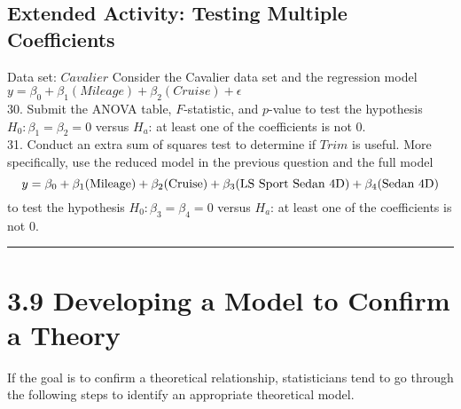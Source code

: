 \documentclass[
]{report}
\theoremstyle{definition}
\theoremstyle{definition}
\theoremstyle{definition}
\theoremstyle{definition}
\theoremstyle{remark}
\begin{document}
\hypertarget{extended-activity-testing-multiple-coefficients}{%
\subsection*{Extended Activity: Testing Multiple Coefficients}\label{extended-activity-testing-multiple-coefficients}}

Data set: \(Cavalier\)
Consider the Cavalier data set and the regression model \(y = \beta_0 + \beta_1(Mileage) + \beta_2(Cruise) + \epsilon\)\\
30. Submit the ANOVA table, \(F\)-statistic, and \(p\)-value to test the hypothesis \(H_0: \beta_1 = \beta_2 = 0\) versus \(H_a\): at least one of the coefficients is not 0.\\
31. Conduct an extra sum of squares test to determine if \(Trim\) is useful. More specifically, use the reduced model in the previous question and the full model
\begin{equation}
y = \beta_0 + \beta_1(\text{Mileage}) + \beta_2(\text{Cruise}) + \beta_3(\text{LS Sport Sedan 4D}) + \beta_4(\text{Sedan 4D}) \notag
\end{equation}
to test the hypothesis \(H_0: \beta_3 = \beta_4 = 0\) versus \(H_a\): at least one of the coefficients is not 0.

\begin{center}\rule{0.5\linewidth}{0.5pt}\end{center}

\hypertarget{developing-a-model-to-confirm-a-theory}{%
\section{3.9 Developing a Model to Confirm a Theory}\label{developing-a-model-to-confirm-a-theory}}

If the goal is to confirm a theoretical relationship, statisticians tend to go through the following steps to identify an appropriate theoretical model.
\end{document}
